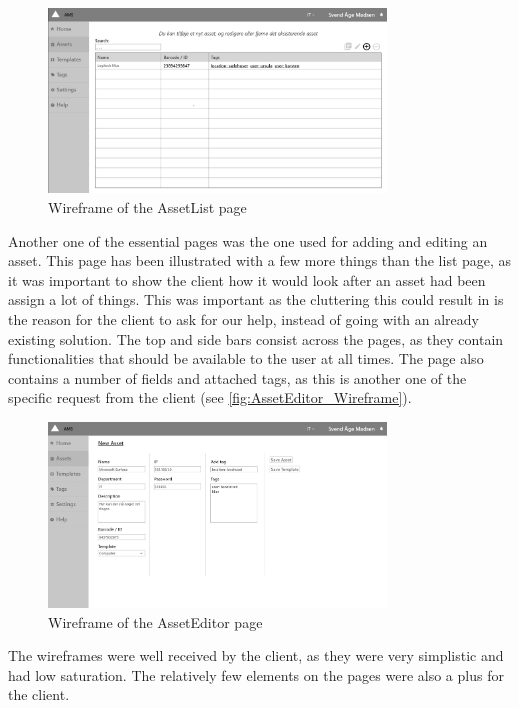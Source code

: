 \begin{figure}[H]
    \centering
    \includegraphics[width=0.8\textwidth]{figures/wireframes/AssetList_Wireframe.png}
    \caption{Wireframe of the AssetList page}
    \label{fig:AssetList_Wireframe}
\end{figure}

Another one of the essential pages was the one used for adding and editing an asset. This page has been illustrated with a few more things than the list page, as it was important to show the client how it would look after an asset had been assign a lot of things. This was important as the cluttering this could result in is the reason for the client to ask for our help, instead of going with an already existing solution. The top and side bars consist across the pages, as they contain functionalities that should be available to the user at all times. The page also contains a number of fields and attached tags, as this is another one of the specific request from the client (see \autoref{fig:AssetEditor_Wireframe}).

\begin{figure}[H]
    \centering
    \includegraphics[width=0.8\textwidth]{figures/wireframes/AssetEditor_Wireframe.png}
    \caption{Wireframe of the AssetEditor page}
    \label{fig:AssetEditor_Wireframe}
\end{figure}

The wireframes were well received by the client, as they were very simplistic and had low saturation. The relatively few elements on the pages were also a plus for the client.

